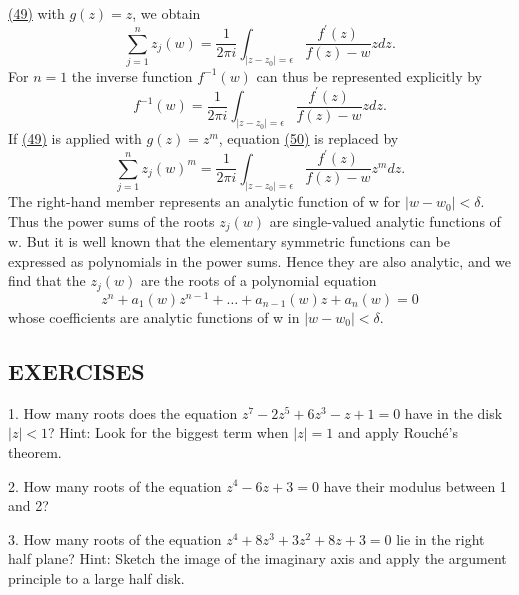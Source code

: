 \hyperref[eq:4.49]{(49)} with $g(z) = z$, we obtain
\begin{equation*}
\sum_ {j = 1} ^ {n} z _ {j} (w) = \frac {1}{2 \pi i} \int_ {| z - z _ {0} | = \epsilon} \frac {f ^ {\prime} (z)}{f (z) - w} z d z.\tag{50}\label{eq:4.50}
\end{equation*}
For $n = 1$ the inverse function $f^{-1}(w)$ can thus be represented explicitly by
\begin{equation*}
f ^ {- 1} (w) = \frac {1}{2 \pi i} \int_ {| z - z _ {0} | = \epsilon} \frac {f ^ {\prime} (z)}{f (z) - w} z d z.
\end{equation*}
If \hyperref[eq:4.49]{(49)} is applied with $g(z) = z^m$, equation \hyperref[eq:4.50]{(50)} is replaced by
\begin{equation*}
\sum_ {j = 1} ^ {n} z _ {j} (w) ^ {m} = \frac {1}{2 \pi i} \int_ {| z - z _ {0} | = \epsilon} \frac {f ^ {\prime} (z)}{f (z) - w} z ^ {m} d z.
\end{equation*}
The right-hand member represents an analytic function of w for $|w - w_{0}| < \delta$. Thus the power sums of the roots $z_{j}(w)$ are single-valued analytic functions of w. But it is well known that the elementary symmetric functions can be expressed as polynomials in the power sums. Hence they are also analytic, and we find that the $z_{j}(w)$ are the roots of a polynomial equation
\begin{equation*}
z ^ {n} + a _ {1} (w) z ^ {n - 1} + \dots + a _ {n - 1} (w) z + a _ {n} (w) = 0
\end{equation*}
whose coefficients are analytic functions of w in $|w - w_{0}| < \delta$.

\subsection*{EXERCISES}
1. How many roots does the equation $z^7 - 2z^5 + 6z^3 - z + 1 = 0$ have in the disk $|z| < 1$? Hint: Look for the biggest term when $|z| = 1$ and apply Rouché's theorem.

2. How many roots of the equation $z^{4}-6z+3=0$ have their modulus between 1 and 2?

3. How many roots of the equation $z^{4} + 8z^{3} + 3z^{2} + 8z + 3 = 0$ lie in the right half plane? Hint: Sketch the image of the imaginary axis and apply the argument principle to a large half disk.

